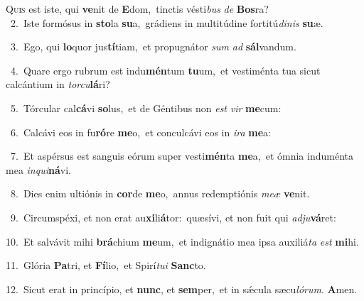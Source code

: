 \lettrine{\initial\textcolor{\initialcolor}{Q}}{uis} est iste, qui \textbf{ve}\-nit de \textbf{E}\-dom,~\star tinctis vésti\textit{bus} \textit{de} \textbf{Bos}\-ra?\\
{\numbfont\textcolor{\numbcolor}{~2.}}~Iste formósus in \textbf{sto}\-la \textbf{su}\-a,~\star grádiens in multitúdine fortitú\-\textit{di}\-\textit{nis} \textbf{su}\-æ.\par
{\numbfont\textcolor{\numbcolor}{~3.}}~Ego, qui \textbf{lo}\-quor jus\-\textbf{tí}\-tiam,~\star et propugnátor \textit{sum} \textit{ad} \textbf{sál}\-vandum.\par
{\numbfont\textcolor{\numbcolor}{~4.}}~Quare ergo rubrum est indu\-\textbf{mén}\-tum \textbf{tu}\-um,~\star et vestiménta tua sicut calcántium in \textit{tor}\-\textit{cu}\textbf{lá}ri?\par
{\numbfont\textcolor{\numbcolor}{~5.}}~Tórcular cal\-\textbf{cá}\-vi \textbf{so}\-lus,~\star et de Géntibus non \textit{est} \textit{vir} \textbf{me}\-cum:\par
{\numbfont\textcolor{\numbcolor}{~6.}}~Calcávi eos in fu\-\textbf{ró}\-re \textbf{me}\-o,~\star et conculcávi eos in \textit{i}\-\textit{ra} \textbf{me}\-a:\par
{\numbfont\textcolor{\numbcolor}{~7.}}~Et aspérsus est sanguis eórum super vesti\-\textbf{mén}\-ta \textbf{me}\-a,~\star et ómnia induménta mea \textit{in}\-\textit{qui}\textbf{ná}vi.\par
{\numbfont\textcolor{\numbcolor}{~8.}}~Dies enim ultiónis in \textbf{cor}\-de \textbf{me}\-o,~\star annus redemptiónis \textit{me}\-\textit{æ} \textbf{ve}\-nit.\par
{\numbfont\textcolor{\numbcolor}{~9.}}~Circumspéxi, et non erat au\-\textbf{xi}\-li\-\textbf{á}\-tor:~\star quæsívi, et non fuit qui \textit{ad}\-\textit{ju}\textbf{vá}ret:\par
{\numbfont\textcolor{\numbcolor}{10.}}~Et salvávit mihi \textbf{brá}\-chium \textbf{me}\-um,~\star et indignátio mea ipsa auxiliá\textit{ta} \textit{est} \textbf{mi}\-hi.\par
{\numbfont\textcolor{\numbcolor}{11.}}~Glória \textbf{Pa}\-tri, et \textbf{Fí}\-lio,~\star et Spirí\-\textit{tu}\-\textit{i} \textbf{Sanc}\-to.\par
{\numbfont\textcolor{\numbcolor}{12.}}~Sicut erat in princípio, et \textbf{nunc}\-, et \textbf{sem}\-per,~\star et in sǽcula sæcu\-\textit{ló}\-\textit{rum}. \textbf{A}\-men.\par
